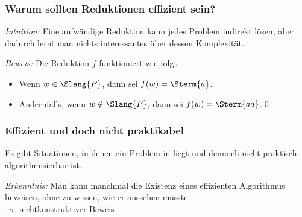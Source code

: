 \documentclass[aspectratio=1610,onlymath]{beamer}
\begin{document}
\begin{frame}\frametitle{Warum sollten Reduktionen effizient sein?}

\emph{Intuition:} Eine aufwändige Reduktion kann jedes Problem indirekt lösen, aber dadurch lernt man nichts
interessantes über dessen Komplexität.\pause
\bigskip

\pause

\emph{Beweis:} Die Reduktion $f$ funktioniert wie folgt:
\begin{itemize}
\item Wenn $w\in \Slang{P}$, dann sei $f(w)=\Sterm{a}$.
\item Andernfalls, wenn $w\notin \Slang{P}$, dann sei $f(w)=\Sterm{aa}$.\qed
\end{itemize}

\end{frame}


\begin{frame}\frametitle{Effizient und doch nicht praktikabel}

Es gibt Situationen, in denen ein Problem in  liegt 
und dennoch nicht praktisch algorithmisierbar ist.\medskip

\bigskip\pause

\pause

\emph{Erkenntnis:} Man kann manchmal die Existenz eines effizienten Algorithmus beweisen,
ohne zu wissen, wie er aussehen müsste.\\
$\leadsto$ \alert{nichtkonstruktiver Beweis}


\end{frame}

\end{document}
